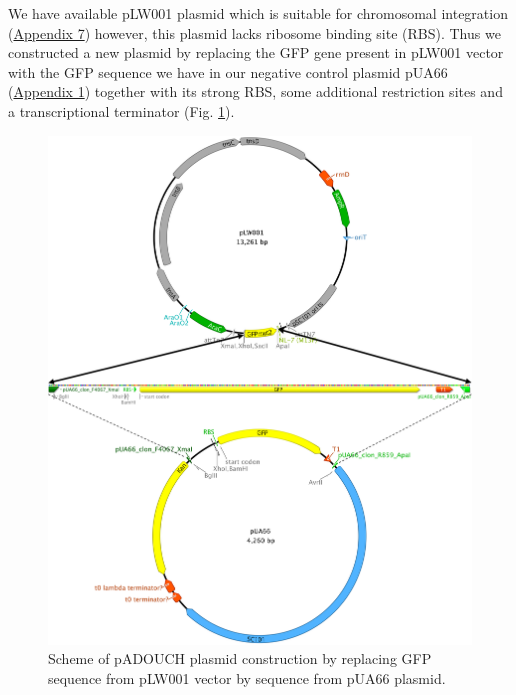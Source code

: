 We have available pLW001 plasmid which is suitable for chromosomal integration (\hyperlink{pLW001}{Appendix 7}) however, this plasmid lacks ribosome binding site (RBS).
Thus we constructed a new plasmid by replacing the GFP gene present in pLW001 vector with the GFP sequence we have in our negative control plasmid pUA66 (\hyperlink{pUA66seq}{Appendix 1}) together with its strong RBS, some additional restriction sites and a transcriptional terminator (Fig. \ref{cloning}).
\begin{figure}[h!]
  \centering
  \includegraphics[scale=0.37]{text/Pictures/Cloning.png}
	\caption{Scheme of pADOUCH plasmid construction by replacing GFP sequence from pLW001 vector by sequence from pUA66 plasmid.}
	\label{cloning}
\end{figure}

